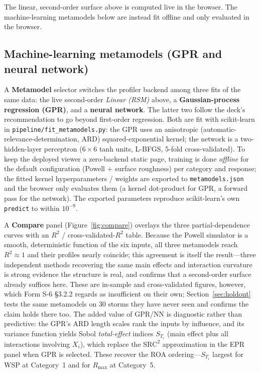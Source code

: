 \documentclass[11pt]{article}
\begin{document}
The linear, second-order surface above is computed live in the browser. The
machine-learning metamodels below are instead fit offline and only evaluated in
the browser.

\subsection{Machine-learning metamodels (GPR and neural network)}
A \textbf{Metamodel} selector switches the profiler backend among three fits of
the same data: the live second-order \emph{Linear (RSM)} above, a
\textbf{Gaussian-process regression (GPR)}, and a \textbf{neural network}. The
latter two follow the deck's recommendation to go beyond first-order regression.
Both are fit with scikit-learn in \texttt{pipeline/fit\_metamodels.py}: the GPR
uses an anisotropic (automatic-relevance-determination, ARD) squared-exponential
kernel; the network is a two-hidden-layer perceptron ($6\times6$ tanh units,
L-BFGS, 5-fold cross-validated). To keep the deployed viewer a zero-backend static
page, training is done \emph{offline} for the default configuration (Powell +
surface roughness) per category and response; the fitted kernel hyperparameters /
weights are exported to \texttt{metamodels.json} and the browser only evaluates
them (a kernel dot-product for GPR, a forward pass for the network). The exported
parameters reproduce scikit-learn's own \texttt{predict} to within $10^{-9}$.

A \textbf{Compare} panel (Figure~\ref{fig:compare}) overlays the three
partial-dependence curves with an $R^2$ / cross-validated-$R^2$ table. Because the
Powell simulator is a smooth, deterministic function of the six inputs, all three
metamodels reach $R^2\approx1$ and their profiles nearly coincide; this agreement
is itself the result---three independent methods recovering the same main effects
and interaction curvature is strong evidence the structure is real, and confirms
that a second-order surface already suffices here. These are in-sample and
cross-validated figures, however, which Form S-6 §3.2.2 regards as insufficient on
their own; Section~\ref{sec:holdout} tests the same metamodels on $30$ storms they
have never seen and confirms the claim holds there too. The added value of GPR/NN is
diagnostic rather than predictive: the GPR's ARD length scales rank the inputs by
influence, and its variance function yields Sobol \emph{total-effect} indices
$S_{T_i}$ (main effect plus all interactions involving $X_i$), which replace the
$\text{SRC}^2$ approximation in the EPR panel when GPR is selected. These recover
the ROA ordering---$S_{T_i}$ largest for WSP at Category~1 and for $R_{\max}$ at
Category~5.
\end{document}
